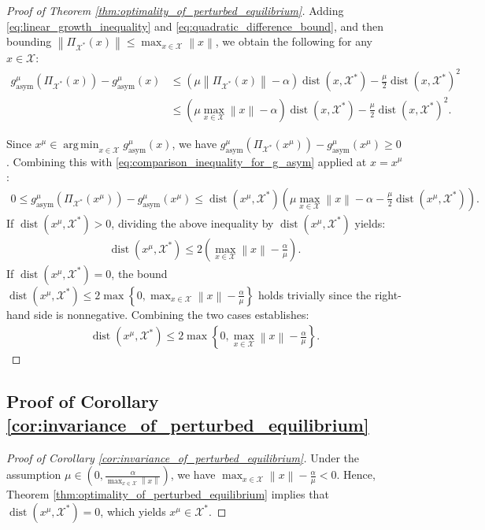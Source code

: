 \documentclass{article}
\DeclareMathOperator*{\argmin}{arg\,min}
\DeclareMathOperator{\dist}{dist}
\newcommand{\X}{\mathcal{X}}
\theoremstyle{plain}
\begin{document}
\begin{proof}[Proof of Theorem \ref{thm:optimality_of_perturbed_equilibrium}]
    Adding \eqref{eq:linear_growth_inequality} and \eqref{eq:quadratic_difference_bound}, and then bounding $\left\|\Pi_{\X^{\ast}}(x)\right\| \leq \max_{x\in \X}\left\|x\right\|$, we obtain the following for any $x\in \X$:
    \begin{align}
        g_{\mathrm{asym}}^{\mu}\left(\Pi_{\X^{\ast}}(x)\right) - g_{\mathrm{asym}}^{\mu}(x)
        & \leq \left(\mu \left\|\Pi_{\X^{\ast}}(x)\right\| - \alpha\right) \dist(x, \X^{\ast}) - \frac{\mu}{2}\dist(x, \X^{\ast})^2 \nonumber \\
        & \leq \left(\mu \max_{x\in \X}\left\|x\right\| - \alpha\right) \dist(x, \X^{\ast}) - \frac{\mu}{2}\dist(x, \X^{\ast})^2.
        \label{eq:comparison_inequality_for_g_asym}
    \end{align}

    Since $x^{\mu}\in \argmin_{x\in \X} g_{\mathrm{asym}}^{\mu}(x)$, we have $g_{\mathrm{asym}}^{\mu}\left(\Pi_{\X^{\ast}}(x^{\mu})\right) - g_{\mathrm{asym}}^{\mu}(x^{\mu}) \geq 0$. Combining this with \eqref{eq:comparison_inequality_for_g_asym} applied at $x = x^{\mu}$:
    \begin{align*}
        0 \leq g_{\mathrm{asym}}^{\mu}\left(\Pi_{\X^{\ast}}(x^{\mu})\right) - g_{\mathrm{asym}}^{\mu}(x^{\mu})
        \leq \dist(x^{\mu}, \X^{\ast}) \left(\mu \max_{x\in \X}\left\|x\right\| - \alpha - \frac{\mu}{2}\dist(x^{\mu}, \X^{\ast})\right).
    \end{align*}
    If $\dist(x^{\mu}, \X^{\ast}) > 0$, dividing the above inequality by $\dist(x^{\mu}, \X^{\ast})$ yields:
    \begin{align*}
        \dist(x^{\mu}, \X^{\ast}) \leq 2 \left(\max_{x\in \X}\left\|x\right\| - \frac{\alpha}{\mu}\right).
    \end{align*}
    If $\dist(x^{\mu}, \X^{\ast}) = 0$, the bound $\dist(x^{\mu}, \X^{\ast}) \leq 2 \max\left\{0, \max_{x\in \X}\left\|x\right\| - \frac{\alpha}{\mu}\right\}$ holds trivially since the right-hand side is nonnegative.
    Combining the two cases establishes:
    \begin{align*}
        \dist(x^{\mu}, \X^{\ast}) \leq 2 \max\left\{0, \max_{x\in \X}\left\|x\right\| - \frac{\alpha}{\mu}\right\}.
    \end{align*}
\end{proof}


\subsection{Proof of Corollary \ref{cor:invariance_of_perturbed_equilibrium}}
\begin{proof}[Proof of Corollary \ref{cor:invariance_of_perturbed_equilibrium}]
    Under the assumption $\mu \in \left(0, \frac{\alpha}{\max_{x\in \X}\left\|x\right\|}\right)$, we have $\max_{x\in \X}\left\|x\right\| - \frac{\alpha}{\mu} < 0$.
    Hence, Theorem \ref{thm:optimality_of_perturbed_equilibrium} implies that $\dist(x^{\mu}, \X^{\ast}) = 0$, which yields $x^{\mu} \in \X^{\ast}$.
\end{proof}
\end{document}
